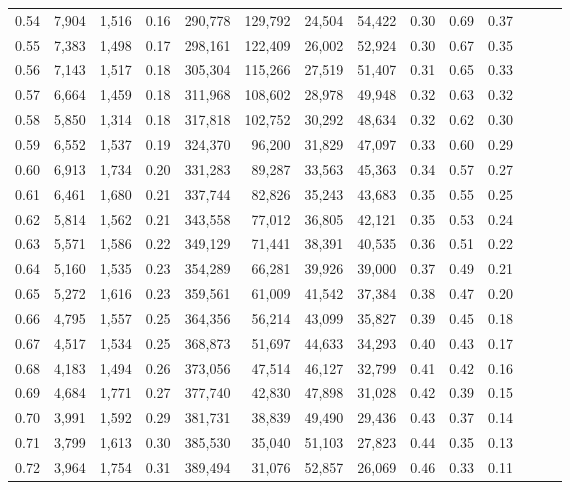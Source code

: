 \begin{tabular}{rrrrrrrrrrrrrr}
0.54 &  7,904 &  1,516 &  0.16 &  290,778 &  129,792 &  24,504 &  54,422 &  0.30 &  0.69 &      0.37 \\
0.55 &  7,383 &  1,498 &  0.17 &  298,161 &  122,409 &  26,002 &  52,924 &  0.30 &  0.67 &      0.35 \\
0.56 &  7,143 &  1,517 &  0.18 &  305,304 &  115,266 &  27,519 &  51,407 &  0.31 &  0.65 &      0.33 \\
0.57 &  6,664 &  1,459 &  0.18 &  311,968 &  108,602 &  28,978 &  49,948 &  0.32 &  0.63 &      0.32 \\
0.58 &  5,850 &  1,314 &  0.18 &  317,818 &  102,752 &  30,292 &  48,634 &  0.32 &  0.62 &      0.30 \\
0.59 &  6,552 &  1,537 &  0.19 &  324,370 &   96,200 &  31,829 &  47,097 &  0.33 &  0.60 &      0.29 \\
0.60 &  6,913 &  1,734 &  0.20 &  331,283 &   89,287 &  33,563 &  45,363 &  0.34 &  0.57 &      0.27 \\
0.61 &  6,461 &  1,680 &  0.21 &  337,744 &   82,826 &  35,243 &  43,683 &  0.35 &  0.55 &      0.25 \\
0.62 &  5,814 &  1,562 &  0.21 &  343,558 &   77,012 &  36,805 &  42,121 &  0.35 &  0.53 &      0.24 \\
0.63 &  5,571 &  1,586 &  0.22 &  349,129 &   71,441 &  38,391 &  40,535 &  0.36 &  0.51 &      0.22 \\
0.64 &  5,160 &  1,535 &  0.23 &  354,289 &   66,281 &  39,926 &  39,000 &  0.37 &  0.49 &      0.21 \\
0.65 &  5,272 &  1,616 &  0.23 &  359,561 &   61,009 &  41,542 &  37,384 &  0.38 &  0.47 &      0.20 \\
0.66 &  4,795 &  1,557 &  0.25 &  364,356 &   56,214 &  43,099 &  35,827 &  0.39 &  0.45 &      0.18 \\
0.67 &  4,517 &  1,534 &  0.25 &  368,873 &   51,697 &  44,633 &  34,293 &  0.40 &  0.43 &      0.17 \\
0.68 &  4,183 &  1,494 &  0.26 &  373,056 &   47,514 &  46,127 &  32,799 &  0.41 &  0.42 &      0.16 \\
0.69 &  4,684 &  1,771 &  0.27 &  377,740 &   42,830 &  47,898 &  31,028 &  0.42 &  0.39 &      0.15 \\
0.70 &  3,991 &  1,592 &  0.29 &  381,731 &   38,839 &  49,490 &  29,436 &  0.43 &  0.37 &      0.14 \\
0.71 &  3,799 &  1,613 &  0.30 &  385,530 &   35,040 &  51,103 &  27,823 &  0.44 &  0.35 &      0.13 \\
0.72 &  3,964 &  1,754 &  0.31 &  389,494 &   31,076 &  52,857 &  26,069 &  0.46 &  0.33 &      0.11 \\

\end{tabular}

